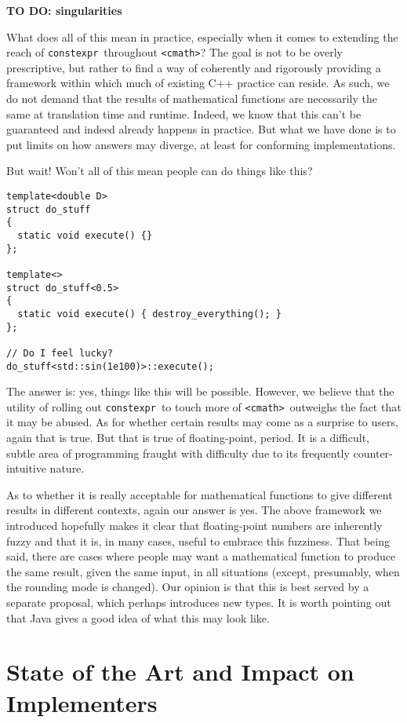 \documentclass[prd,twocolumn,amsmath,amssymb,nofootinbib,eqsecnum]{revtex4-1}
\newcommand{\constexpr}{\code{constexpr}\xspace}
\newcommand{\code}[1]{{\tt #1}}
\newcommand{\header}[1]{{\tt <#1>}}
\newcommand{\cmath}{\header{cmath}}
\begin{document}
{\bf TO DO: singularities}

What does all of this mean in practice, especially when it comes to extending the reach of \constexpr\ throughout \cmath? The goal is not to be overly prescriptive, but rather to find a way of coherently and rigorously providing a framework  within which much of existing C++ practice can reside. As such, we do not demand that the results of mathematical functions are necessarily the same at translation time and runtime. Indeed, we know that this can't be guaranteed and indeed already happens in practice. But what we have done is to put limits on how answers may diverge, at least for conforming implementations.

But wait! Won't all of this mean people can do things like this?
\begin{verbatim}
template<double D>
struct do_stuff
{
  static void execute() {}
};

template<>
struct do_stuff<0.5>
{
  static void execute() { destroy_everything(); }
};

// Do I feel lucky?
do_stuff<std::sin(1e100)>::execute();
\end{verbatim}

The answer is: yes, things like this will be possible. However, we believe that the utility of
rolling out \constexpr\ to touch more of \cmath\ outweighs the fact that it may be abused.
As for whether certain results may come as a surprise to users, again that is true. But that
is true of floating-point, period. It is a difficult, subtle area of programming fraught with difficulty
due to its frequently counter-intuitive nature.

As to whether it is really acceptable for mathematical functions to give different results in different
contexts, again our answer is yes. The above framework we introduced hopefully makes it clear
that floating-point numbers are inherently fuzzy and that it is, in many cases, useful to embrace
this fuzziness. That being said, there are cases where people may want a mathematical function
to produce the same result, given the same input, in all situations (except, presumably, when the rounding mode is changed). Our opinion is that this is best served by a separate proposal, which
perhaps introduces new types. It is worth pointing out that Java gives a good idea of what this
may look like.


\section{State of the Art and Impact on Implementers}
\end{document}
